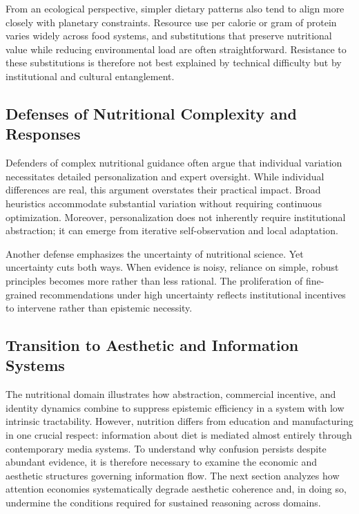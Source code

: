\documentclass[11pt]{article}
\begin{document}
From an ecological perspective, simpler dietary patterns also tend to align more closely with planetary constraints. Resource use per calorie or gram of protein varies widely across food systems, and substitutions that preserve nutritional value while reducing environmental load are often straightforward. Resistance to these substitutions is therefore not best explained by technical difficulty but by institutional and cultural entanglement.

\subsection{Defenses of Nutritional Complexity and Responses}

Defenders of complex nutritional guidance often argue that individual variation necessitates detailed personalization and expert oversight. While individual differences are real, this argument overstates their practical impact. Broad heuristics accommodate substantial variation without requiring continuous optimization. Moreover, personalization does not inherently require institutional abstraction; it can emerge from iterative self-observation and local adaptation.

Another defense emphasizes the uncertainty of nutritional science. Yet uncertainty cuts both ways. When evidence is noisy, reliance on simple, robust principles becomes more rather than less rational. The proliferation of fine-grained recommendations under high uncertainty reflects institutional incentives to intervene rather than epistemic necessity.

\subsection{Transition to Aesthetic and Information Systems}

The nutritional domain illustrates how abstraction, commercial incentive, and identity dynamics combine to suppress epistemic efficiency in a system with low intrinsic tractability. However, nutrition differs from education and manufacturing in one crucial respect: information about diet is mediated almost entirely through contemporary media systems. To understand why confusion persists despite abundant evidence, it is therefore necessary to examine the economic and aesthetic structures governing information flow. The next section analyzes how attention economies systematically degrade aesthetic coherence and, in doing so, undermine the conditions required for sustained reasoning across domains.
\end{document}
